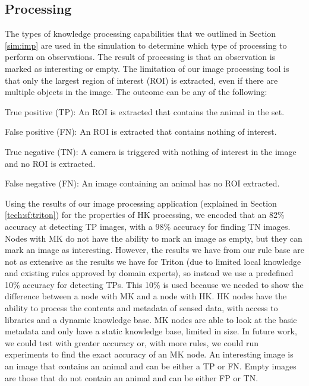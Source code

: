 \subsection{Processing}
	The types of knowledge processing capabilities that we outlined in Section \ref{sim:imp} are used in the simulation to determine which type of processing to perform on observations. The result of processing is that an observation is marked as interesting or empty. The limitation of our image processing tool is that only the largest region of interest (ROI) is extracted, even if there are multiple objects in the image. The outcome can be any of the following:
		\begin{description}
			\item True positive (TP): An ROI is extracted that contains the animal in the set.
			\item False positive (FN): An ROI is extracted that contains nothing of interest.
			\item True negative (TN): A camera is triggered with nothing of interest in the image and no ROI is extracted.
			\item False negative (FN): An image containing an animal has no ROI extracted.
		\end{description}
	
	Using the results of our image processing application (explained in Section \ref{tech:sf:triton}) for the properties of HK processing, we encoded that an 82\% accuracy at detecting TP images, with a 98\% accuracy for finding TN images. Nodes with MK do not have the ability to mark an image as empty, but they can mark an image as interesting. However, the results we have from our rule base are not as extensive as the results we have for Triton (due to limited local knowledge and existing rules approved by domain experts), so instead we use a predefined 10\% accuracy for detecting TPs. This 10\% is used because we needed to show the difference between a node with MK and a node with HK. HK nodes have the ability to process the contents and metadata of sensed data, with access to libraries and a dynamic knowledge base. MK nodes are able to look at the basic metadata and only have a static knowledge base, limited in size. In future work, we could test with greater accuracy or, with more rules, we could run experiments to find the exact accuracy of an MK node. An interesting image is an image that contains an animal and can be either a TP or FN. Empty images are those that do not contain an animal and can be either FP or TN.

